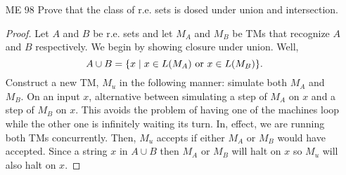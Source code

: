\documentclass{article}
\newcommand{\setst}{\hspace{1mm} | \hspace{1mm} }
\theoremstyle{definition}
\begin{document}
\begin{enumerate}
\begin{proof}
		Conversely, assume that $E$ enumerates a set $A$ in increasing order. We will simulate $E$ with a three tape TM $M$ where $E$ is simulated on the bottom two tapes and the input is on the first tape. We begin simulating $E$ and every time $E$ enumerates a string, we check to conditions. If the input $x$ is equal to the enumerated string $e$, then, the $M$ accepts $x$ and halts. If $x$ is greater than $e$, then we have already passed the place where $x$ would be enumerated so it cannot be in $L(E)$. Thus, $M$ rejects on $x$ and halts. 
	\end{proof}
	\item[ME 98] Prove that the class of r.e. sets is dosed under union and intersection.
	\begin{proof}
		Let $A$ and $B$ be r.e. sets and let $M_A$ and $M_B$ be TMs that recognize $A$ and $B$ respectively. We begin by showing closure under union. Well,
		\[A \cup B = \{x \setst x \in L(M_A) \text{ or } x \in L(M_B)\}.\]
		Construct a new TM, $M_u$ in the following manner: simulate both $M_A$ and $M_B$. On an input $x$, alternative between simulating a step of $M_A$ on $x$ and a step of $M_B$ on $x$. This avoids the problem of having one of the machines loop while the other one is infinitely waiting its turn. In, effect, we are running both TMs concurrently. Then, $M_u$ accepts if either $M_A$ or $M_B$ would have accepted. Since a string $x$ in $A \cup B$ then $M_A$ or $M_B$ will halt on $x$ so $M_u$ will also halt on $x$.
		

\end{proof}
\end{enumerate}
\end{document}
